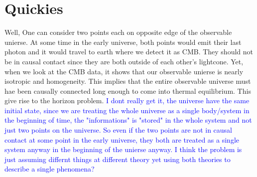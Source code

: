 \section{Quickies}
Well, One can consider two points each on opposite edge of the observable unierse. At some time in the early universe, both points would emit their last photon and it would travel to earth where we detect it as CMB. They should not be in causal contact since they are both outside of each other's lightcone. Yet, when we look at the CMB data, it shows that our observable  unierse is nearly isotropic and  homogeneity. This implies that the entire observable universe must hae been causally connected long enough to come into thermal equilibrium. This give rise to the horizon problem. 
\textcolor{blue}{I dont really get it, the universe have the same initial state, since we are treating the whole universe as a single body/system in the beginning of time, the "informations" is "stored" in the whole system and not just two points on the universe. So even if the two points are not in causal contact at some point in the early universe, they both are treated as a single system anyway in the beginning of the unierse anyway. I think the problem is just assuming differnt things at different theory yet using both theories to describe a single phenomena?}